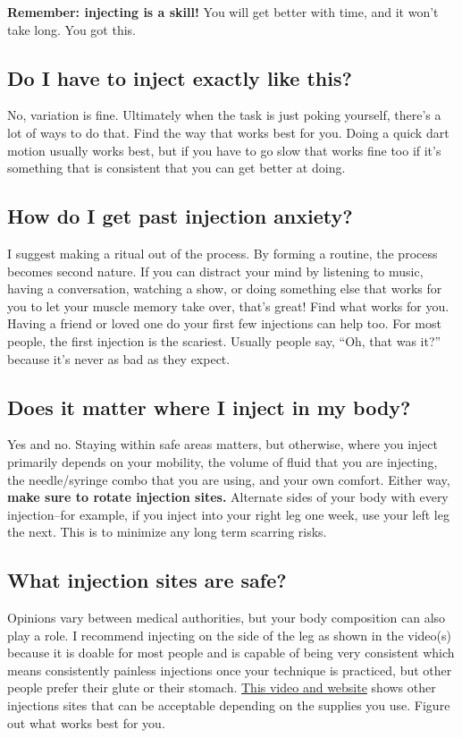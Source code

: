 \documentclass{article}
\begin{document}
\textbf{Remember: injecting is a skill!} You will get better with time, and it won’t take long. You got this.

\subsection{Do I have to inject exactly like this?}

No, variation is fine. Ultimately when the task is just poking yourself, there’s a lot of ways to do that. Find the way that works best for you. Doing a quick dart motion usually works best, but if you have to go slow that works fine too if it’s something that is consistent that you can get better at doing.

\subsection{How do I get past injection anxiety?}

I suggest making a ritual out of the process. By forming a routine, the process becomes second nature. If you can distract your mind by listening to music, having a conversation, watching a show, or doing something else that works for you to let your muscle memory take over, that’s great! Find what works for you. Having a friend or loved one do your first few injections can help too. For most people, the first injection is the scariest. Usually people say, “Oh, that was it?” because it’s never as bad as they expect.

\subsection{Does it matter where I inject in my body?}

Yes and no. Staying within safe areas matters, but otherwise, where you inject primarily depends on your mobility, the volume of fluid that you are injecting, the needle/syringe combo that you are using, and your own comfort. Either way, \textbf{make sure to rotate injection sites.} Alternate sides of your body with every injection–for example, if you inject into your right leg one week, use your left leg the next. This is to minimize any long term scarring risks.

\subsection{What injection sites are safe?}

Opinions vary between medical authorities, but your body composition can also play a role. I recommend injecting on the side of the leg as shown in the video(s) because it is doable for most people and is capable of being very consistent which means consistently painless injections once your technique is practiced, but other people prefer their glute or their stomach. \href{https://vertisis.com/articles/how-to-self-administer-a-subcutaneous-injection}{This video and website} shows other injections sites that can be acceptable depending on the supplies you use. Figure out what works best for you.
\end{document}
